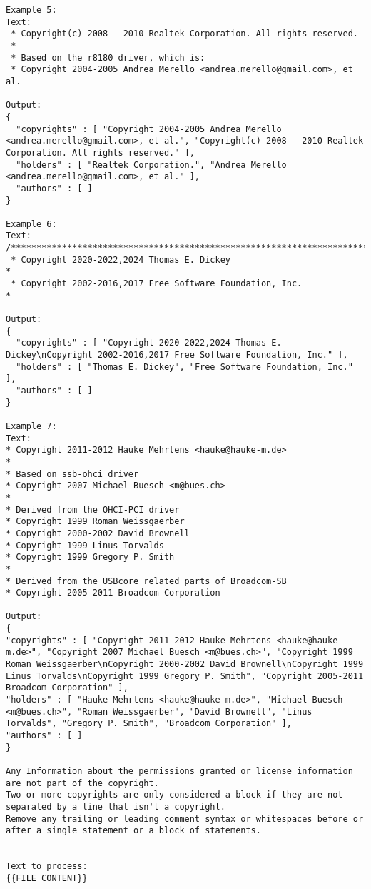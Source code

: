 \begin{lstlisting}[keepspaces=true]
Example 5:
Text:
 * Copyright(c) 2008 - 2010 Realtek Corporation. All rights reserved.
 *
 * Based on the r8180 driver, which is:
 * Copyright 2004-2005 Andrea Merello <andrea.merello@gmail.com>, et al.

Output:
{
  "copyrights" : [ "Copyright 2004-2005 Andrea Merello <andrea.merello@gmail.com>, et al.", "Copyright(c) 2008 - 2010 Realtek Corporation. All rights reserved." ],
  "holders" : [ "Realtek Corporation.", "Andrea Merello <andrea.merello@gmail.com>, et al." ],
  "authors" : [ ]
}

Example 6:
Text:
/****************************************************************************
 * Copyright 2020-2022,2024 Thomas E. Dickey                                *
 * Copyright 2002-2016,2017 Free Software Foundation, Inc.                  *

Output:
{
  "copyrights" : [ "Copyright 2020-2022,2024 Thomas E. Dickey\nCopyright 2002-2016,2017 Free Software Foundation, Inc." ],
  "holders" : [ "Thomas E. Dickey", "Free Software Foundation, Inc." ],
  "authors" : [ ]
}

Example 7:
Text:
* Copyright 2011-2012 Hauke Mehrtens <hauke@hauke-m.de>
*
* Based on ssb-ohci driver
* Copyright 2007 Michael Buesch <m@bues.ch>
*
* Derived from the OHCI-PCI driver
* Copyright 1999 Roman Weissgaerber
* Copyright 2000-2002 David Brownell
* Copyright 1999 Linus Torvalds
* Copyright 1999 Gregory P. Smith
*
* Derived from the USBcore related parts of Broadcom-SB
* Copyright 2005-2011 Broadcom Corporation

Output:
{
"copyrights" : [ "Copyright 2011-2012 Hauke Mehrtens <hauke@hauke-m.de>", "Copyright 2007 Michael Buesch <m@bues.ch>", "Copyright 1999 Roman Weissgaerber\nCopyright 2000-2002 David Brownell\nCopyright 1999 Linus Torvalds\nCopyright 1999 Gregory P. Smith", "Copyright 2005-2011 Broadcom Corporation" ],
"holders" : [ "Hauke Mehrtens <hauke@hauke-m.de>", "Michael Buesch <m@bues.ch>", "Roman Weissgaerber", "David Brownell", "Linus Torvalds", "Gregory P. Smith", "Broadcom Corporation" ],
"authors" : [ ]
}

Any Information about the permissions granted or license information are not part of the copyright.
Two or more copyrights are only considered a block if they are not separated by a line that isn't a copyright.
Remove any trailing or leading comment syntax or whitespaces before or after a single statement or a block of statements.

---
Text to process:
{{FILE_CONTENT}}
\end{lstlisting}

